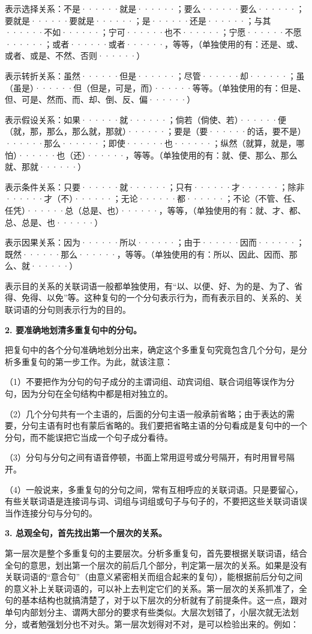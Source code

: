 表示选择关系：不是······就是······；要么······要么······；要就是······要就是······；是······还是······；与其······不如······；宁可······也不······；宁愿······不愿······；或者······或者······，等等，（单独使用的有：还是、或、或者、或是、不然、否则······）

表示转折关系：虽然······但是······；尽管······却······；虽（虽是）······但（但是，可是，而）······等等。（单独使用的有：但是、但、可是、然而、而、却、倒、反、偏······）

表示假设关系：如果······就······；倘若（倘使、若）······便（就，那，那么，那么就，那就）······；要是（要······的话，要不是）······那么······；即使······也······；纵然（就算，就是，哪怕）······也（还）······，等等。（单独使用的有：就、便、那么、那么就、那就······）

表示条件关系：只要······就······；只有······才······；除非······才（不）······；无论······都······；不论（不管、任、任凭）······总（总是、也）······，等等，（单独使用的有：就、才、都、总、总是、也······）

表示因果关系：因为······所以······；由于······因而······；既然······那么······，等等。（单独使用的有：所以、因此、因而、那么、就······）

表示目的关系的关联词语一般都单独使用，有“以、以便、好、为的是、为了、省得、免得、以免”等。这种复句的一个分句表示行为，而有表示目的、关系的、关联词语的分句则表示行为的目的。

\textbf{2. 要准确地划清多重复句中的分句。}

把复句中的各个分句准确地划分出来，确定这个多重复句究竟包含几个分句，是分析多重复句的第一步工作。为此，就该注意：

（1）不要把作为分句的句子成分的主谓词组、动宾词组、联合词组等误作为分句，因为分句在全句结构中都是相对独立的。

（2）几个分句共有一个主语的，后面的分句主语一般承前省略；由于表达的需要，分句主语有时也有蒙后省略的。我们要把省略主语的分句看成是复句中的一个分句，而不能误把它当成一个句子成分看待。

（3）分句与分句之间有语音停顿，书面上常用逗号或分号隔开，有时用冒号隔开。

（4）一般说来，多重复句的分句之间，常有互相呼应的关联词语。只是要留心，有些关联词语是连接词与词、词组与词组或句子与句子的，不要把这些关联词语误当作连接分句与分句的。

\textbf{3. 总观全句，首先找出第一个层次的关系。}

第一层次是整个多重复句的主要层次。分析多重复句，首先要根据关联词语，结合全句的意思，划出第一个层次的前后几个部分，判定第一层次的关系。如果是没有关联词语的“意合句”（由意义紧密相关而组合起来的复句），能根据前后分句之间的意义补上关联词语的，可以补上去判定它们的关系。第一层次的关系抓准了，全句的基本结构也就搞清楚了，对于以下层次的分析就有了前提条件。这一点，跟对单句内部划分主、谓两大部分的要求有些类似。大层次划错了，小层次就无法划分，或者勉强划分也不对头。第一层次划得对不对，是可以检验出来的。例如：

